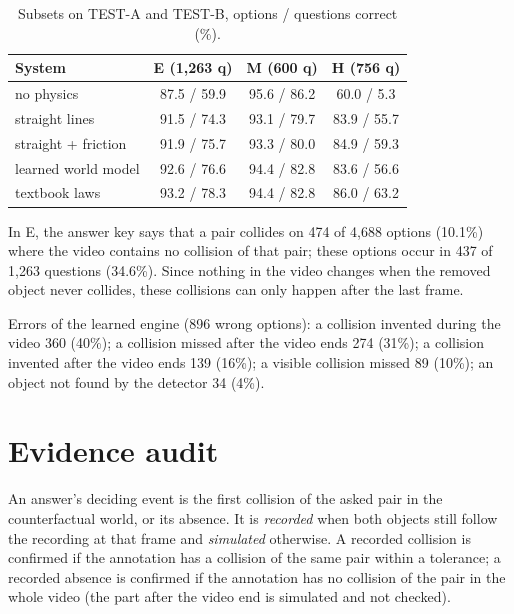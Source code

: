 \documentclass[10pt,onecolumn,letterpaper]{article}
\begin{document}
\begin{table}[h]
\caption{Subsets on TEST-A and TEST-B, options / questions correct (\%).}
\label{tab:subsets}
\centering
\small
\begin{tabular}{@{}lccc@{}}
\toprule
System & E (1,263 q) & M (600 q) & H (756 q) \\
\midrule
no physics & 87.5 / 59.9 & 95.6 / 86.2 & 60.0 / 5.3 \\
straight lines & 91.5 / 74.3 & 93.1 / 79.7 & 83.9 / 55.7 \\
straight + friction & 91.9 / 75.7 & 93.3 / 80.0 & 84.9 / 59.3 \\
learned world model & 92.6 / 76.6 & 94.4 / 82.8 & 83.6 / 56.6 \\
textbook laws & 93.2 / 78.3 & 94.4 / 82.8 & 86.0 / 63.2 \\
\bottomrule
\end{tabular}
\end{table}

In E, the answer key says that a pair collides on 474 of 4,688 options (10.1\%) where the video contains no collision of that pair; these options occur in 437 of 1,263 questions (34.6\%).
Since nothing in the video changes when the removed object never collides, these collisions can only happen after the last frame.

Errors of the learned engine (896 wrong options): a collision invented during the video 360 (40\%); a collision missed after the video ends 274 (31\%); a collision invented after the video ends 139 (16\%); a visible collision missed 89 (10\%); an object not found by the detector 34 (4\%).

\section{Evidence audit}
\label{app:events}

An answer's deciding event is the first collision of the asked pair in the counterfactual world, or its absence.
It is \emph{recorded} when both objects still follow the recording at that frame and \emph{simulated} otherwise.
A recorded collision is confirmed if the annotation has a collision of the same pair within a tolerance; a recorded absence is confirmed if the annotation has no collision of the pair in the whole video (the part after the video end is simulated and not checked).
\end{document}
